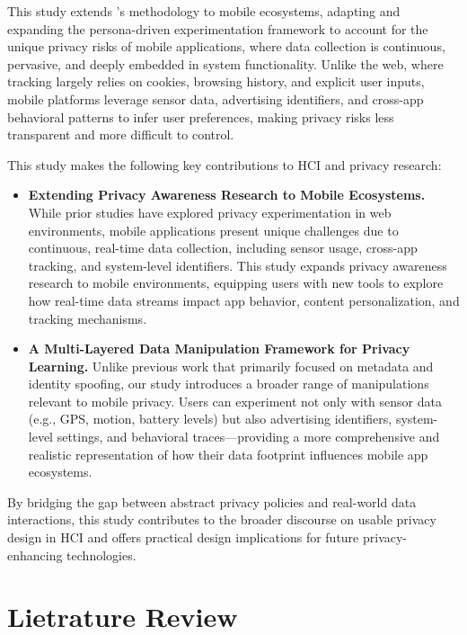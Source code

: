 \documentclass[acmlarge, nonacm]{acmart}
\begin{document}
This study extends \citet{Chaoran2023EmpathySandbox}'s methodology to mobile ecosystems, adapting and expanding the persona-driven experimentation framework to account for the unique privacy risks of mobile applications, where data collection is continuous, pervasive, and deeply embedded in system functionality. Unlike the web, where tracking largely relies on cookies, browsing history, and explicit user inputs, mobile platforms leverage sensor data, advertising identifiers, and cross-app behavioral patterns to infer user preferences, making privacy risks less transparent and more difficult to control.

This study makes the following key contributions to HCI and privacy research:
\begin{itemize}
    \item 

    \textbf{Extending Privacy Awareness Research to Mobile Ecosystems.}
While prior studies have explored privacy experimentation in web environments, mobile applications present unique challenges due to continuous, real-time data collection, including sensor usage, cross-app tracking, and system-level identifiers. This study expands privacy awareness research to mobile environments, equipping users with new tools to explore how real-time data streams impact app behavior, content personalization, and tracking mechanisms.
    
    \item \textbf{A Multi-Layered Data Manipulation Framework for Privacy Learning.}
Unlike previous work that primarily focused on metadata and identity spoofing, our study introduces a broader range of manipulations relevant to mobile privacy. Users can experiment not only with sensor data (e.g., GPS, motion, battery levels) but also advertising identifiers, system-level settings, and behavioral traces—providing a more comprehensive and realistic representation of how their data footprint influences mobile app ecosystems.
\end{itemize}

By bridging the gap between abstract privacy policies and real-world data interactions, this study contributes to the broader discourse on usable privacy design in HCI and offers practical design implications for future privacy-enhancing technologies.

\section{Lietrature Review}
\end{document}
